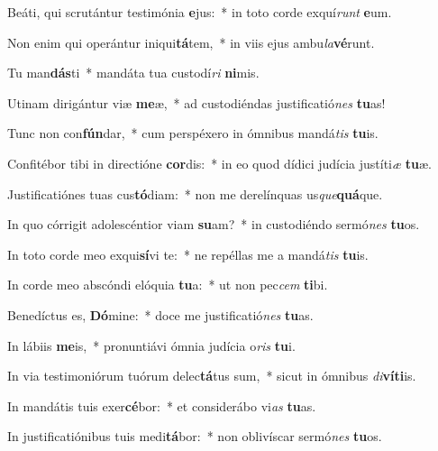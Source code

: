 \item Beáti, qui scrutántur testimónia \textbf{e}jus:~* in toto corde exquí\textit{runt} \textbf{e}um.
\item Non enim qui operántur iniqui\textbf{tá}tem,~* in viis ejus ambu\textit{la}\textbf{vé}runt.
\item Tu man\textbf{dás}ti~* mandáta tua custodí\textit{ri} \textbf{ni}mis.
\item Utinam dirigántur viæ \textbf{me}æ,~* ad custodiéndas justificatió\textit{nes} \textbf{tu}as!
\item Tunc non con\textbf{fún}dar,~* cum perspéxero in ómnibus mandá\textit{tis} \textbf{tu}is.
\item Confitébor tibi in directióne \textbf{cor}dis:~* in eo quod dídici judícia justíti\textit{æ} \textbf{tu}æ.
\item Justificatiónes tuas cus\textbf{tó}diam:~* non me derelínquas us\textit{que}\textbf{quá}que.
\item In quo córrigit adolescéntior viam \textbf{su}am?~* in custodiéndo sermó\textit{nes} \textbf{tu}os.
\item In toto corde meo exqui\textbf{sí}vi te:~* ne repéllas me a mandá\textit{tis} \textbf{tu}is.
\item In corde meo abscóndi elóquia \textbf{tu}a:~* ut non pec\textit{cem} \textbf{ti}bi.
\item Benedíctus es, \textbf{Dó}mine:~* doce me justificatió\textit{nes} \textbf{tu}as.
\item In lábiis \textbf{me}is,~* pronuntiávi ómnia judícia o\textit{ris} \textbf{tu}i.
\item In via testimoniórum tuórum delec\textbf{tá}tus sum,~* sicut in ómnibus \textit{di}\textbf{ví}\textbf{ti}is.
\item In mandátis tuis exer\textbf{cé}bor:~* et considerábo vi\textit{as} \textbf{tu}as.
\item In justificatiónibus tuis medi\textbf{tá}bor:~* non oblivíscar sermó\textit{nes} \textbf{tu}os.
